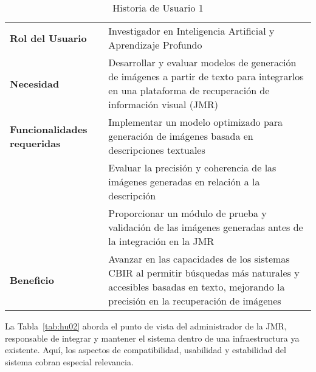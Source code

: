 \begin{table}[ht]
    \centering
    \renewcommand{\arraystretch}{1.5}
    \begin{tabular}{|>{\columncolor{gray!10}}p{4cm}|p{10cm}|}
        \hline
        \rowcolor{gray!30}
        \multicolumn{2}{|c|}{\textbf{Historia de Usuario 1}} \\
        \hline
        \textbf{Rol del Usuario} & Investigador en Inteligencia Artificial y Aprendizaje Profundo \\
        \hline
        \textbf{Necesidad} & Desarrollar y evaluar modelos de generación de imágenes a partir de texto para integrarlos en una plataforma de recuperación de información visual (JMR) \\
        \hline
        \textbf{Funcionalidades requeridas} & Implementar un modelo optimizado para generación de imágenes basada en descripciones textuales
        \\ & Evaluar la precisión y coherencia de las imágenes generadas en relación a la descripción
        \\ & Proporcionar un módulo de prueba y validación de las imágenes generadas antes de la integración en la JMR \\
        \hline
        \textbf{Beneficio} & Avanzar en las capacidades de los sistemas CBIR al permitir búsquedas más naturales y accesibles basadas en texto, mejorando la precisión en la recuperación de imágenes \\
        \hline
    \end{tabular}
    \caption{Historia de Usuario 1}
    \label{tab:hu01}
\end{table}

La Tabla~\ref{tab:hu02} aborda el punto de vista del administrador de la JMR, responsable de integrar y mantener el sistema dentro de una infraestructura ya existente. Aquí, los aspectos de compatibilidad, usabilidad y estabilidad del sistema cobran especial relevancia.

